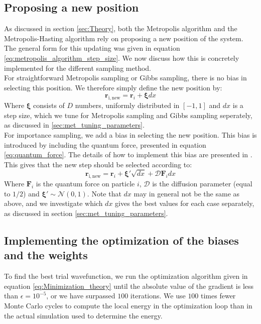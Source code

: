 \documentclass[a4paper, 10pt]{article}
\begin{document}
	\subsection{Proposing a new position}\label{sec:met_propose_new_position}
	As discussed in section \ref{sec:Theory}, both the Metropolis algorithm and the Metropolis-Hasting algorithm rely on proposing a new position of the system. The general form for this updating was given in equation \ref{eq:metropolis_algorithm_step_size}. We now discuss how this is concretely implemented for the different sampling method.\\
	\linebreak
	For straightforward Metropolis sampling or Gibbs sampling, there is no bias in selecting this position. We therefore simply define the new position by:
	\begin{equation}
	\boldsymbol{r}_{\mathrm{i,new}}=\boldsymbol{r}_i+\boldsymbol{\xi}dx
	\end{equation}
	Where $\boldsymbol{\xi}$ consists of $D$ numbers, uniformly distributed in $[-1,1]$ and $dx$ is a step size, which we tune for Metropolis sampling and Gibbs sampling seperately, as discussed in \ref{sec:met_tuning_parameters}.\\
	\linebreak
	For importance sampling, we add a bias in selecting the new position. This bias is introduced by including the quantum force, presented in equation \ref{eq:quantum_force}. The details of how to implement this bias are presented in \cite{Hjorth-Jensen2015}. This gives that the new step should be selected according to:
	\begin{equation}
	\boldsymbol{r}_{\mathrm{i,new}}=\boldsymbol{r}_i+\boldsymbol{\xi'}\sqrt{dx}+\mathcal{D}\boldsymbol{F}_i dx
	\end{equation}
	Where $\boldsymbol{F}_i$ is the quantum force on particle $i$, $\mathcal{D}$ is the diffusion parameter (equal to $1/2$) and $\boldsymbol{\xi'}\sim \mathcal{N}(0,1)$. Note that $dx$ may in general not be the same as above, and we investigate which $dx$ gives the best values for each case separately, as discussed in section \ref{sec:met_tuning_parameters}.
	\subsection{Implementing the optimization of the biases and the weights}
	To find the best trial wavefunction, we run the optimization algorithm given in equation \ref{eq:Minimization_theory} until the absolute value of the gradient is less than $\epsilon=10^{-5}$, or we have surpassed $100$ iterations. We use $100$ times fewer Monte Carlo cycles to compute the local energy in the optimization loop than in the actual simulation used to determine the energy.
\end{document}
